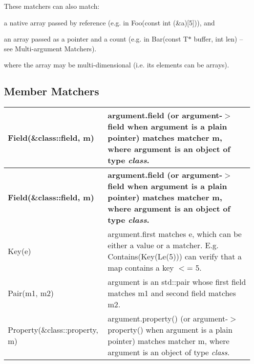These matchers can also match\+:


\begin{DoxyEnumerate}
\item a native array passed by reference (e.\+g. in {\ttfamily Foo(const int (\&a)\mbox{[}5\mbox{]})}), and
\end{DoxyEnumerate}
\begin{DoxyEnumerate}
\item an array passed as a pointer and a count (e.\+g. in {\ttfamily Bar(const T$\ast$ buffer, int len)} -- see Multi-\/argument Matchers).
\end{DoxyEnumerate}

where the array may be multi-\/dimensional (i.\+e. its elements can be arrays).

\subsection*{Member Matchers}

\tabulinesep=1mm
\begin{longtabu}spread 0pt [c]{*{2}{|X[-1]}|}
\hline
\cellcolor{\tableheadbgcolor}\textbf{ {\ttfamily Field(\&class\+::field, m)}  }&\cellcolor{\tableheadbgcolor}\textbf{ {\ttfamily argument.\+field} (or {\ttfamily argument-\/$>$field} when {\ttfamily argument} is a plain pointer) matches matcher {\ttfamily m}, where {\ttfamily argument} is an object of type {\itshape class}.   }\\
\endfirsthead
\hline
\endfoot
\hline
\cellcolor{\tableheadbgcolor}\textbf{ {\ttfamily Field(\&class\+::field, m)}  }&\cellcolor{\tableheadbgcolor}\textbf{ {\ttfamily argument.\+field} (or {\ttfamily argument-\/$>$field} when {\ttfamily argument} is a plain pointer) matches matcher {\ttfamily m}, where {\ttfamily argument} is an object of type {\itshape class}.   }\\
\endhead
{\ttfamily Key(e)}  &{\ttfamily argument.\+first} matches {\ttfamily e}, which can be either a value or a matcher. E.\+g. {\ttfamily Contains(Key(\+Le(5)))} can verify that a {\ttfamily map} contains a key {\ttfamily $<$= 5}.   \\
{\ttfamily Pair(m1, m2)}  &{\ttfamily argument} is an {\ttfamily std\+::pair} whose {\ttfamily first} field matches {\ttfamily m1} and {\ttfamily second} field matches {\ttfamily m2}.   \\
{\ttfamily Property(\&class\+::property, m)}  &{\ttfamily argument.\+property()} (or {\ttfamily argument-\/$>$property()} when {\ttfamily argument} is a plain pointer) matches matcher {\ttfamily m}, where {\ttfamily argument} is an object of type {\itshape class}.   \\
\end{longtabu}


